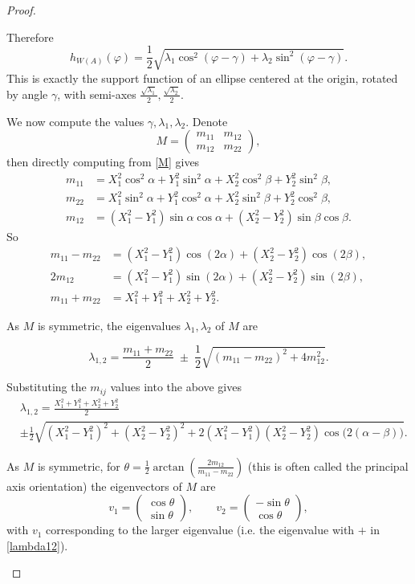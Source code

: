 \documentclass[10pt,a4paper]{amsart}
\renewcommand{\phi}{\varphi}
\begin{document}
\begin{proof}
\begin{enumerate}
Therefore
\[
h_{W(A)}(\phi) =\frac{1}{2} \sqrt{\lambda_1 \cos^2(\phi-\gamma) + \lambda_2 \sin^2(\phi-\gamma)}.
\]
This is exactly the support function of an ellipse centered at the origin, rotated by angle $\gamma$, with semi-axes $\frac{\sqrt{\lambda_1}}{2}, \frac{\sqrt{\lambda_2}}{2}$.  


We now compute the values $\gamma, \lambda_1, \lambda_2$. Denote
\[
M = \begin{pmatrix} m_{11} & m_{12} \\[2mm] m_{12} & m_{22} \end{pmatrix},
\]
then directly computing from \eqref{M} gives
\[
\begin{aligned}
m_{11} &= X_1^2 \cos^2\alpha + Y_1^2 \sin^2\alpha + X_2^2 \cos^2\beta + Y_2^2 \sin^2\beta,\\[1mm]
m_{22} &= X_1^2 \sin^2\alpha + Y_1^2 \cos^2\alpha + X_2^2 \sin^2\beta + Y_2^2 \cos^2\beta,\\[1mm]
m_{12} &= (X_1^2 - Y_1^2)\sin\alpha \cos\alpha + (X_2^2 - Y_2^2)\sin\beta \cos\beta.
\end{aligned}
\]
So
\[
\begin{aligned}
m_{11}-m_{22} &= (X_1^2 - Y_1^2)\cos(2\alpha) + (X_2^2 - Y_2^2)\cos(2\beta),\\[1mm]
2 m_{12} &= (X_1^2 - Y_1^2)\sin(2\alpha) + (X_2^2 - Y_2^2)\sin(2\beta),\\[1mm]
m_{11}+m_{22} &= X_1^2 + Y_1^2 + X_2^2 + Y_2^2.
\end{aligned}
\]

As $M$ is symmetric, the eigenvalues \(\lambda_1, \lambda_2\) of \(M\) are

\begin{equation}\label{lambda12}
    \lambda_{1,2} = \frac{m_{11}+m_{22}}{2} \;\pm\; \frac{1}{2}\sqrt{(m_{11}-m_{22})^2 + 4 m_{12}^2}.
\end{equation}

Substituting the $m_{ij}$ values into the above gives
\[
\begin{aligned}
&\lambda_{1,2} = \frac{X_1^2 + Y_1^2 + X_2^2 + Y_2^2}{2} \; \\
&\pm \frac{1}{2}\sqrt{(X_1^2-Y_1^2)^2 + (X_2^2-Y_2^2)^2 + 2(X_1^2-Y_1^2)(X_2^2-Y_2^2)\cos\big(2(\alpha-\beta)\big)}.
\end{aligned}
\]

As $M$ is symmetric, for $
\theta = \tfrac{1}{2}\arctan\!\left(\frac{2m_{12}}{m_{11}-m_{22}}\right)$ (this is often called the principal axis orientation)
the eigenvectors of $M$ are
\[
v_1 = \begin{pmatrix}
\cos\theta \\ 
\sin\theta
\end{pmatrix},
\qquad
v_2 = \begin{pmatrix}
-\sin\theta \\ 
\cos\theta
\end{pmatrix},
\]
with $v_1$ corresponding to the larger eigenvalue (i.e. the eigenvalue with $+$ in \eqref{lambda12}).




\end{enumerate}
\end{proof}
\end{document}
